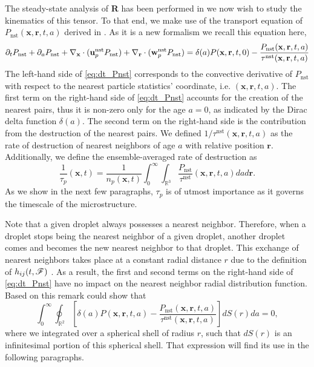The steady-state analysis of \textbf{R} has been performed in \citet{fintzi2024buoyancy} we now wish to study the kinematics   of this tensor. 
To that end, we make use of the transport equation of $P_\text{nst}(\textbf{x},\textbf{r},t,a)$ derived in \citet{zhang2023evolution}.
As it is a new formalism we recall this equation here, 
\begin{equation}
    \pddt P_\text{nst}
    + \pdda P_\text{nst}
    + \pddx \cdot  (\textbf{u}^\text{nst}_p P_\text{nst})
    + \pddr \cdot  (\textbf{w}^\text{nst}_p P_\text{nst})
    = \delta(a)P(\textbf{x},\textbf{r},t,0)
    - \frac{P_\text{nst}(\textbf{x},\textbf{r},t,a)}{\tau^\text{nst}(\textbf{x},\textbf{r},t,a)}
    \label{eq:dt_Pnst}
\end{equation}
The left-hand side of \ref{eq:dt_Pnst} corresponds to the convective derivative of $P_\text{nst}$ with respect to the nearest particle statistics' coordinate, i.e. $(\textbf{x},\textbf{r},t,a)$. 
The first term on the right-hand side of \ref{eq:dt_Pnst} accounts for the creation of the nearest pairs, thus it is non-zero only for the age $a = 0$, as indicated by the Dirac delta function $\delta(a)$. 
The second term on the right-hand side is the contribution from the destruction of the nearest pairs.
We defined $1/\tau^\text{nst}(\textbf{x},\textbf{r},t,a)$ as the rate of destruction of nearest neighbors of age $a$ with relative position $\textbf{r}$.
Additionally, we define the ensemble-averaged rate of destruction as
\begin{equation}
    \frac{1}{\tau_p}(\textbf{x},t) = 
    \frac{1}{n_p(\textbf{x},t)}
    \int_{0}^\infty
    \int_{\mathbb{R}^3}
    \frac{P_\text{nst} }{\tau^\text{nst}}(\textbf{x},\textbf{r},t,a)
    da d\textbf{r}. 
    \label{eq:tau_p}
\end{equation}
As we show in the next few paragraphs, $\tau_p$ is of utmost importance as it governs the timescale of the microstructure.

Note that a given droplet always possesses a nearest neighbor.
Therefore, when a droplet stops being the nearest neighbor of a given droplet, another droplet comes and becomes the new nearest neighbor to that droplet.
This exchange of nearest neighbors takes place at a constant radial distance $r$ due to the definition of $h_{ij}(t,\mathscr{F})$ \citep{zhang2021ensemble}. 
As a result, the first and second terms on the right-hand side of \ref{eq:dt_Pnst} have no impact on the nearest neighbor radial distribution function. 
Based on this remark \citep{zhang2023evolution} could show that
\begin{equation}
    \int_{0}^{\infty}\oint_{\mathbb{R}^2}\left[
        \delta(a)P(\textbf{x},\textbf{r},t,a)
    - \frac{P_\text{nst}(\textbf{x},\textbf{r},t,a)}{\tau^\text{nst}(\textbf{x},\textbf{r},t,a)}
    \right]dS(r) da    
    =0,
    \label{eq:int_dt_h}
\end{equation}
where we integrated over a spherical shell of radius $r$, such that $dS(r)$ is an infinitesimal portion of this spherical shell. 
That expression will find its use in the following paragraphs. 


